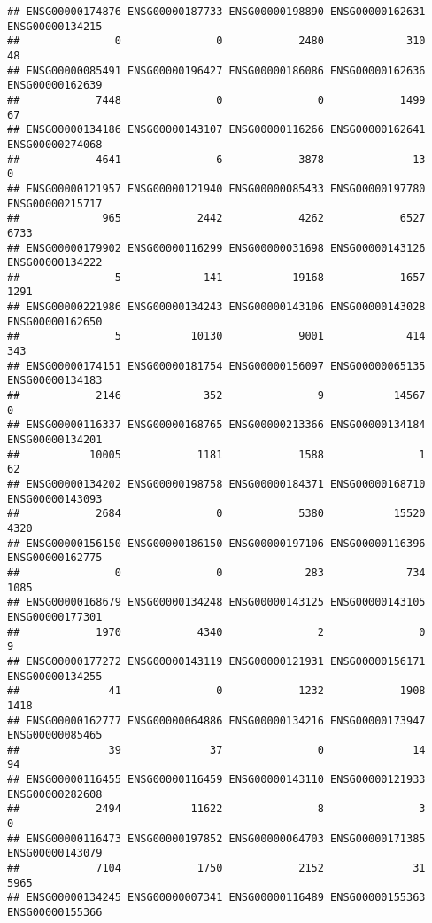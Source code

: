 \documentclass[
]{article}
\begin{document}
\begin{verbatim}
## ENSG00000174876 ENSG00000187733 ENSG00000198890 ENSG00000162631 ENSG00000134215 
##               0               0            2480             310              48 
## ENSG00000085491 ENSG00000196427 ENSG00000186086 ENSG00000162636 ENSG00000162639 
##            7448               0               0            1499              67 
## ENSG00000134186 ENSG00000143107 ENSG00000116266 ENSG00000162641 ENSG00000274068 
##            4641               6            3878              13               0 
## ENSG00000121957 ENSG00000121940 ENSG00000085433 ENSG00000197780 ENSG00000215717 
##             965            2442            4262            6527            6733 
## ENSG00000179902 ENSG00000116299 ENSG00000031698 ENSG00000143126 ENSG00000134222 
##               5             141           19168            1657            1291 
## ENSG00000221986 ENSG00000134243 ENSG00000143106 ENSG00000143028 ENSG00000162650 
##               5           10130            9001             414             343 
## ENSG00000174151 ENSG00000181754 ENSG00000156097 ENSG00000065135 ENSG00000134183 
##            2146             352               9           14567               0 
## ENSG00000116337 ENSG00000168765 ENSG00000213366 ENSG00000134184 ENSG00000134201 
##           10005            1181            1588               1              62 
## ENSG00000134202 ENSG00000198758 ENSG00000184371 ENSG00000168710 ENSG00000143093 
##            2684               0            5380           15520            4320 
## ENSG00000156150 ENSG00000186150 ENSG00000197106 ENSG00000116396 ENSG00000162775 
##               0               0             283             734            1085 
## ENSG00000168679 ENSG00000134248 ENSG00000143125 ENSG00000143105 ENSG00000177301 
##            1970            4340               2               0               9 
## ENSG00000177272 ENSG00000143119 ENSG00000121931 ENSG00000156171 ENSG00000134255 
##              41               0            1232            1908            1418 
## ENSG00000162777 ENSG00000064886 ENSG00000134216 ENSG00000173947 ENSG00000085465 
##              39              37               0              14              94 
## ENSG00000116455 ENSG00000116459 ENSG00000143110 ENSG00000121933 ENSG00000282608 
##            2494           11622               8               3               0 
## ENSG00000116473 ENSG00000197852 ENSG00000064703 ENSG00000171385 ENSG00000143079 
##            7104            1750            2152              31            5965 
## ENSG00000134245 ENSG00000007341 ENSG00000116489 ENSG00000155363 ENSG00000155366 

\end{verbatim}
\end{document}
